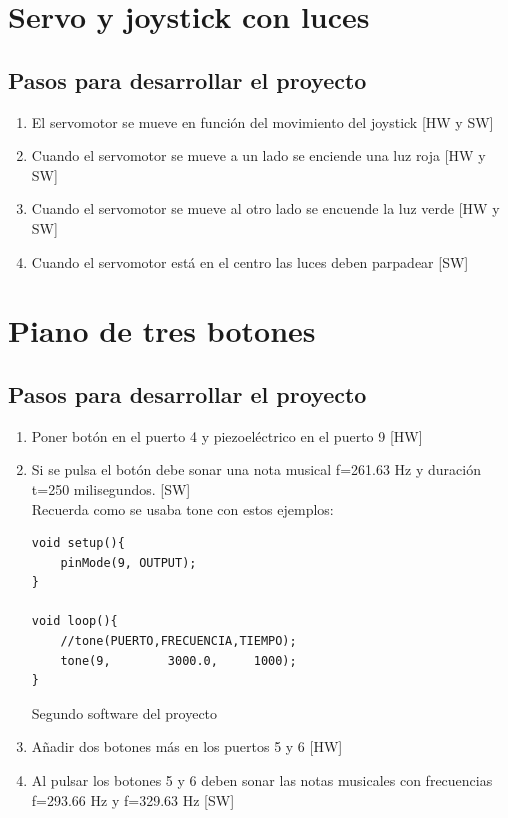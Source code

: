 \documentclass[11pt,spanish,a4paper]{article}
\begin{document}
\section{Servo y joystick con luces}

\subsection{Pasos para desarrollar el proyecto}
\begin{enumerate}
	\item El servomotor se mueve en función del movimiento del joystick [HW y SW]
	\item Cuando el servomotor se mueve a un lado se enciende una luz roja [HW y SW]
	\item Cuando el servomotor se mueve al otro lado se encuende la luz verde [HW y SW]
	\item Cuando el servomotor está en el centro las luces deben parpadear [SW]
\end{enumerate}


\section{Piano de tres botones}

\subsection{Pasos para desarrollar el proyecto}
\begin{enumerate}
	\item Poner botón en el puerto 4 y piezoeléctrico en el puerto 9 [HW]
	\item Si se pulsa el botón debe sonar una nota musical f=261.63 Hz y duración t=250
		milisegundos. [SW]  \\

		Recuerda como se usaba tone con estos ejemplos: \\


\begin{listing}[H]
\begin{verbatim}
void setup(){
    pinMode(9, OUTPUT);
}

void loop(){
    //tone(PUERTO,FRECUENCIA,TIEMPO);
    tone(9,        3000.0,     1000);
}
\end{verbatim}
	\caption{Segundo software del proyecto \thesection}
\end{listing}

	\item Añadir dos botones más en los puertos 5 y 6 [HW]
	\item Al pulsar los botones 5 y 6 deben sonar las notas musicales con frecuencias f=293.66 Hz y
		f=329.63 Hz [SW]
\end{enumerate}
\end{document}
